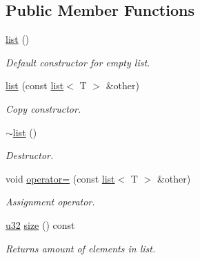 \subsection*{Public Member Functions}
\begin{DoxyCompactItemize}
\item 
\mbox{\label{classirr_1_1core_1_1list_aa4de347b726e57c72270377e1a07d41a}} 
\hyperlink{classirr_1_1core_1_1list_aa4de347b726e57c72270377e1a07d41a}{list} ()
\begin{DoxyCompactList}\small\item\em Default constructor for empty list. \end{DoxyCompactList}\item 
\mbox{\label{classirr_1_1core_1_1list_a28c5e720eb16cee8bf8c26c233de3722}} 
\hyperlink{classirr_1_1core_1_1list_a28c5e720eb16cee8bf8c26c233de3722}{list} (const \hyperlink{classirr_1_1core_1_1list}{list}$<$ T $>$ \&other)
\begin{DoxyCompactList}\small\item\em Copy constructor. \end{DoxyCompactList}\item 
\mbox{\label{classirr_1_1core_1_1list_a5c760fcc63fb6446a33d91e950736a57}} 
\hyperlink{classirr_1_1core_1_1list_a5c760fcc63fb6446a33d91e950736a57}{$\sim$list} ()
\begin{DoxyCompactList}\small\item\em Destructor. \end{DoxyCompactList}\item 
\mbox{\label{classirr_1_1core_1_1list_a43d98ff46af6eb5f4b1f9f71e2f0601c}} 
void \hyperlink{classirr_1_1core_1_1list_a43d98ff46af6eb5f4b1f9f71e2f0601c}{operator=} (const \hyperlink{classirr_1_1core_1_1list}{list}$<$ T $>$ \&other)
\begin{DoxyCompactList}\small\item\em Assignment operator. \end{DoxyCompactList}\item 
\hyperlink{namespaceirr_a0416a53257075833e7002efd0a18e804}{u32} \hyperlink{classirr_1_1core_1_1list_a374ab663f2439599a6b99b47a31e793d}{size} () const
\begin{DoxyCompactList}\small\item\em Returns amount of elements in list. \end{DoxyCompactList}\item 

\end{DoxyCompactItemize}
